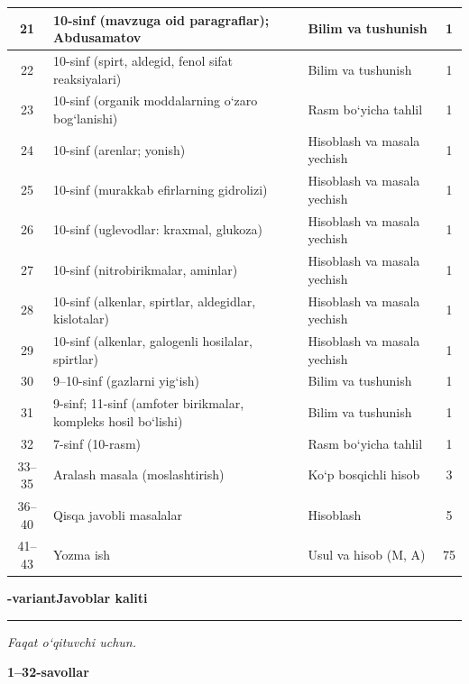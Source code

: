 \documentclass[11pt,a4paper]{article}
\newcommand{\hdrpill}[1]{\begin{tikzpicture}[baseline=0pt]\node[fill=ygreen,text=white,rounded corners=8pt,inner xsep=10pt,inner ysep=5pt,font=\fontsize{13}{15}\bfseries\selectfont] at (0,0.475){#1};\end{tikzpicture}}
\newcommand{\curvar}{}\fancyhead[R]{\hdrpill{\curvar}}
\begin{document}
{\begin{longtable}{|c|p{7.2cm}|p{5.4cm}|c|}
21 & 10-sinf (mavzuga oid paragraflar); Abdusamatov & Bilim va tushunish & 1\\\hline
22 & 10-sinf (spirt, aldegid, fenol sifat reaksiyalari) & Bilim va tushunish & 1\\\hline
23 & 10-sinf (organik moddalarning o`zaro bog`lanishi) & Rasm bo`yicha tahlil & 1\\\hline
24 & 10-sinf (arenlar; yonish) & Hisoblash va masala yechish & 1\\\hline
25 & 10-sinf (murakkab efirlarning gidrolizi) & Hisoblash va masala yechish & 1\\\hline
26 & 10-sinf (uglevodlar: kraxmal, glukoza) & Hisoblash va masala yechish & 1\\\hline
27 & 10-sinf (nitrobirikmalar, aminlar) & Hisoblash va masala yechish & 1\\\hline
28 & 10-sinf (alkenlar, spirtlar, aldegidlar, kislotalar) & Hisoblash va masala yechish & 1\\\hline
29 & 10-sinf (alkenlar, galogenli hosilalar, spirtlar) & Hisoblash va masala yechish & 1\\\hline
30 & 9--10-sinf (gazlarni yig`ish) & Bilim va tushunish & 1\\\hline
31 & 9-sinf; 11-sinf (amfoter birikmalar, kompleks hosil bo`lishi) & Bilim va tushunish & 1\\\hline
32 & 7-sinf (10-rasm) & Rasm bo`yicha tahlil & 1\\\hline
33--35 & Aralash masala (moslashtirish) & Ko`p bosqichli hisob & 3\\\hline
36--40 & Qisqa javobli masalalar & Hisoblash & 5\\\hline
41--43 & Yozma ish & Usul va hisob (M, A) & 75\\\hline
\end{longtable}}
\renewcommand{\curvar}{Javoblar}
\newpage
\noindent\textbf{\fontsize{13}{15}-variant}\hfill \textbf{Javoblar kaliti}\par\smallskip\hrule\smallskip
\textit{Faqat o`qituvchi uchun.}\par\medskip
\noindent\textbf{1--32-savollar}\par\smallskip
\end{document}
